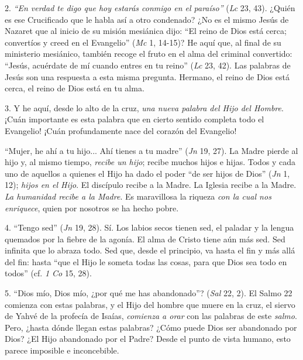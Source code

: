 			\begin{body}2. \textit{“En verdad te digo que hoy estarás conmigo en el paraíso”} (\textit{Lc} 23, 43). ¿Quién es ese Crucificado que le habla así a otro condenado? ¿No es el mismo Jesús de Nazaret que al inicio de su misión mesiánica dijo: “El reino de Dios está cerca; convertíos y creed en el Evangelio” (\textit{Mc} 1, 14-15)? He aquí que, al final de su ministerio mesiánico, también recoge el fruto en el alma del criminal convertido: “Jesús, acuérdate de mí cuando entres en tu reino” (\textit{Lc} 23, 42). Las palabras de Jesús son una respuesta a esta misma pregunta. Hermano, el reino de Dios está cerca, el reino de Dios está en tu alma. \end{body}
			
			\begin{body}3. Y he aquí, desde lo alto de la cruz, \textit{una nueva palabra del Hijo del Hombre}. ¡Cuán importante es esta palabra que en cierto sentido completa todo el Evangelio! ¡Cuán profundamente nace del corazón del Evangelio! \end{body}
			
			\begin{body}“Mujer, he ahí a tu hijo... Ahí tienes a tu madre” (\textit{Jn }19, 27). La Madre pierde al hijo y, al mismo tiempo, \textit{recibe un hijo}; recibe muchos hijos e hijas. Todos y cada uno de aquellos a quienes el Hijo ha dado el poder “de ser hijos de Dios” (\textit{Jn }1, 12);\textit{ hijos en el Hijo}. El discípulo recibe a la Madre. La Iglesia recibe a la Madre. \textit{La humanidad recibe a la Madre}. Es maravillosa la riqueza \textit{con la cual nos enriquece}, quien por nosotros se ha hecho pobre. \end{body}
			
			\begin{body}4. “Tengo sed” (\textit{Jn }19, 28). Sí. Los labios secos tienen sed, el paladar y la lengua quemados por la fiebre de la agonía. El alma de Cristo tiene aún más sed. Sed infinita que lo abraza todo. Sed que, desde el principio, va hasta el fin y más allá del fin: hasta “que el Hijo le someta todas las cosas, para que Dios sea todo en todos” (cf. \textit{1 Co }15, 28). \end{body}
			
			\begin{body}5. “Dios mío, Dios mío, ¿por qué me has abandonado”? (\textit{Sal} 22, 2). El Salmo 22 comienza con estas palabras, y el Hijo del hombre que muere en la cruz, el siervo de Yahvé de la profecía de Isaías, \textit{comienza a orar} con las palabras de este \textit{salmo}. Pero, ¿hasta dónde llegan estas palabras? ¿Cómo puede Dios ser abandonado por Dios? ¿El Hijo abandonado por el Padre? Desde el punto de vista humano, esto parece imposible e inconcebible. \end{body}
			
